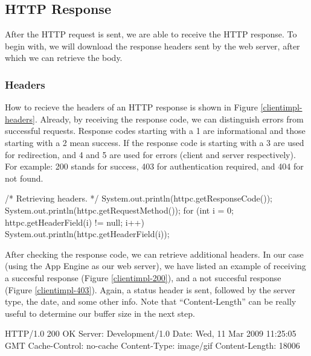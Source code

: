 \subsection{HTTP Response}
After the HTTP request is sent, we are able to receive the HTTP response. To
begin with, we will download the response headers sent by the web server, after
which we can retrieve the body.

\subsubsection{Headers}
How to recieve the headers of an HTTP response is shown in Figure
\ref{clientimpl-headers}. Already, by receiving the response code, we can
distinguish errors from successful requests. Response codes starting with a 1 are
informational and those starting with a 2 mean success. If the response code is
starting with a 3 are used for redirection, and 4 and 5 are used for errors
(client and server respectively). For example: 200 stands for success, 403 for
authentication required, and 404 for not found.

\begin{figure*}[ht] %
\begin{center}
\begin{code}
/* Retrieving headers. */
System.out.println(httpc.getResponseCode());
System.out.println(httpc.getRequestMethod());
for (int i = 0; httpc.getHeaderField(i) != null; i++) {
    System.out.println(httpc.getHeaderField(i));
}
\end{code}
\caption{Retrieving HTTP response headers.\label{clientimpl-headers}}
\end{center}
\end{figure*}

After checking the response code, we can retrieve additional headers. In our case
(using the App Engine as our web server), we have listed an example of receiving
a succesful response (Figure \ref{clientimpl-200}), and a not succesful response
(Figure \ref{clientimpl-403}). Again, a status header is sent, followed by the
server type, the date, and some other info. Note that ``Content-Length'' can be
really useful to determine our buffer size in the next step.

\begin{figure*}[ht] %
\begin{center}
\begin{code}
HTTP/1.0 200 OK
Server: Development/1.0
Date: Wed, 11 Mar 2009 11:25:05 GMT
Cache-Control: no-cache
Content-Type: image/gif
Content-Length: 18006
\end{code}
\caption{Example of HTTP response headers.\label{clientimpl-200}}
\end{center}
\end{figure*}

